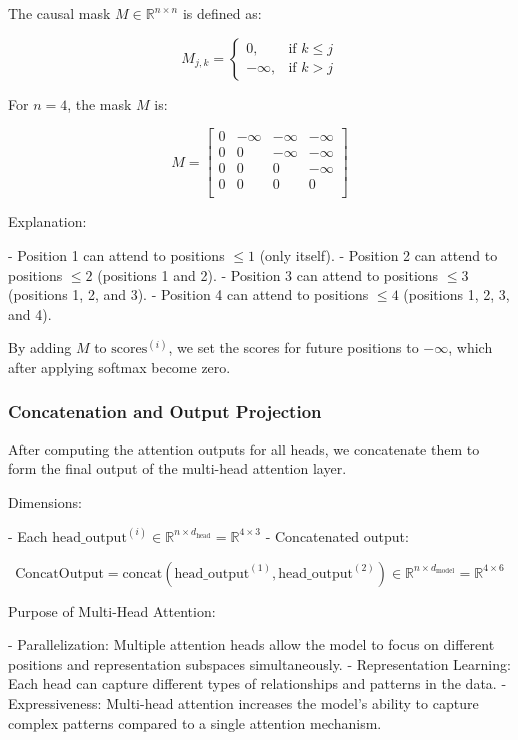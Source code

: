 \documentclass{article}
\begin{document}
The causal mask \( M \in \mathbb{R}^{n \times n} \) is defined as:

\[
    M_{j,k} =
    \begin{cases}
        0, & \text{if } k \leq j \\
        -\infty, & \text{if } k > j
    \end{cases}
\]

For \( n = 4 \), the mask \( M \) is:

\[
    M = \begin{bmatrix}
        0 & -\infty & -\infty & -\infty \\
        0 & 0 & -\infty & -\infty \\
        0 & 0 & 0 & -\infty \\
        0 & 0 & 0 & 0 \\
    \end{bmatrix}
\]

Explanation:

- Position 1 can attend to positions \( \leq 1 \) (only itself).
- Position 2 can attend to positions \( \leq 2 \) (positions 1 and 2).
- Position 3 can attend to positions \( \leq 3 \) (positions 1, 2, and 3).
- Position 4 can attend to positions \( \leq 4 \) (positions 1, 2, 3, and 4).

By adding \( M \) to \( \text{scores}^{(i)} \), we set the scores for future positions to \(-\infty\), which after applying softmax become zero.

\subsubsection{Concatenation and Output Projection}

After computing the attention outputs for all heads, we concatenate them to form the final output of the multi-head attention layer.

Dimensions:

- Each \( \text{head\_output}^{(i)} \in \mathbb{R}^{n \times d_{\text{head}}} = \mathbb{R}^{4 \times 3} \)
- Concatenated output:

  \[
  \text{ConcatOutput} = \text{concat}\left( \text{head\_output}^{(1)}, \text{head\_output}^{(2)} \right) \in \mathbb{R}^{n \times d_{\text{model}}} = \mathbb{R}^{4 \times 6}
  \]

Purpose of Multi-Head Attention:

- Parallelization: Multiple attention heads allow the model to focus on different positions and representation subspaces simultaneously.
- Representation Learning: Each head can capture different types of relationships and patterns in the data.
- Expressiveness: Multi-head attention increases the model's ability to capture complex patterns compared to a single attention mechanism.
\end{document}
